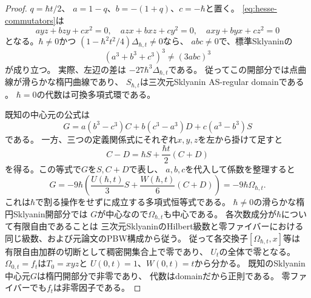 \begin{proof}
$q=\hbar t/2$、
$a=1-q$、$b=-(1+q)$、$c=-\hbar$と置く。
\eqref{eq:hesse-commutators}は
\begin{equation}
 ayz+bzy+cx^2=0,\quad
 azx+bxz+cy^2=0,\quad
 axy+byx+cz^2=0
\end{equation}
となる。$\hbar\ne0$かつ
$(1-\hbar^2t^2/4)\Delta_{\hbar,t}\ne0$なら、
$abc\ne0$で、標準Sklyaninの
\begin{equation}
 (a^3+b^3+c^3)^3\ne(3abc)^3
\end{equation}
が成り立つ。
実際、左辺の差は
$-27\hbar^3\Delta_{\hbar,t}$である。
従ってこの開部分では点曲線が滑らかな楕円曲線であり、
$S_{\hbar,t}$は三次元Sklyanin AS-regular domainである
\cite{SmithTate,DeLaetLeBruyn}。
$\hbar=0$の代数は可換多項式環である。

既知の中心元の公式は
\begin{equation}
 G=a(b^3-c^3)C+
   b(c^3-a^3)D+
   c(a^3-b^3)S
 \label{eq:hesse-sklyanin-G}
\end{equation}
である\cite[Section 2]{DeLaetLeBruyn}。
一方、三つの定義関係式にそれぞれ$x,y,z$を左から掛けて足すと
\begin{equation}
 C-D=\hbar S+\frac{\hbar t}{2}(C+D)
 \label{eq:hesse-CD}
\end{equation}
を得る。この等式で$G$を$S,C+D$で表し、
$a,b,c$を代入して係数を整理すると
\begin{equation}
 G=-9\hbar\left(
       \frac{U(\hbar,t)}3S+
       \frac{W(\hbar,t)}6(C+D)\right)
   =-9\hbar\Omega_{\hbar,t}.
 \label{eq:hesse-G-identity}
\end{equation}
これは$\hbar$で割る操作をせずに成立する多項式恒等式である。
$\hbar\ne0$の滑らかな楕円Sklyanin開部分では
$G$が中心なので$\Omega_{\hbar,t}$も中心である。
各次数成分が$\hbar$について有限自由であることは
三次元SklyaninのHilbert級数と零ファイバーにおける
同じ級数、および元論文のPBW構成から従う。
従って各交換子$[\Omega_{\hbar,t},x]$等は
有限自由加群の切断として稠密開集合上で零であり、
$U_t$の全体で零となる。
$\Omega_{0,t}=f_t$は$T_0=xyz$と
$U(0,t)=1$、$W(0,t)=t$から分かる。
既知のSklyanin中心元$G$は楕円開部分で非零であり、
代数はdomainだから正則である。
零ファイバーでも$f_t$は非零因子である。
\end{proof}


